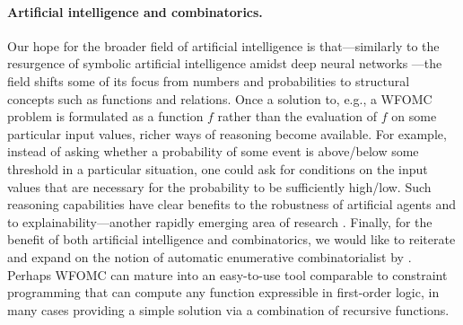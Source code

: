 \paragraph{Artificial intelligence and combinatorics.}
Our hope for the broader field of artificial intelligence is that---similarly to the resurgence of symbolic artificial intelligence amidst deep neural networks \citep{garnelo2019reconciling}---the field shifts some of its focus from numbers and probabilities to structural concepts such as functions and relations. Once a solution to, e.g., a WFOMC problem is formulated as a function $f$ rather than the evaluation of $f$ on some particular input values, richer ways of reasoning become available. For example, instead of asking whether a probability of some event is above/below some threshold in a particular situation, one could ask for conditions on the input values that are necessary for the probability to be sufficiently high/low. Such reasoning capabilities have clear benefits to the robustness of artificial agents and to explainability---another rapidly emerging area of research \citep{DBLP:journals/corr/abs-1909-03012,DBLP:journals/fdata/BelleP21,DBLP:journals/corr/abs-2202-10335}. Finally, for the benefit of both artificial intelligence and combinatorics, we would like to reiterate and expand on the notion of automatic enumerative combinatorialist by \citet{DBLP:conf/ilp/BarvinekB0ZK21}. Perhaps WFOMC can mature into an easy-to-use tool comparable to constraint programming that can compute any function expressible in first-order logic, in many cases providing a simple solution via a combination of recursive functions.


